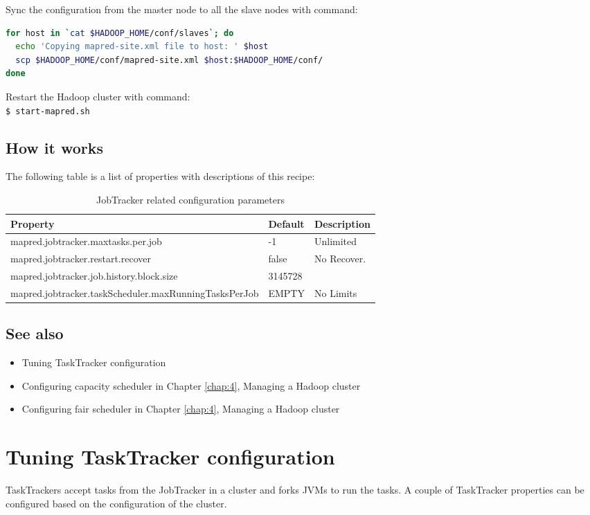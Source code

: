 Sync the configuration from the master node to all the slave nodes with command:
\lstset{style=bashstyle}
\begin{lstlisting}[language=bash]
for host in `cat $HADOOP_HOME/conf/slaves`; do
  echo 'Copying mapred-site.xml file to host: ' $host
  scp $HADOOP_HOME/conf/mapred-site.xml $host:$HADOOP_HOME/conf/
done
\end{lstlisting}


Restart the Hadoop cluster with command: \\
\verb|$ start-mapred.sh|

\subsection*{How it works}
The following table is a list of properties with descriptions of this recipe:
\begin{table}[ht]
  \centering
  \begin{tabular}{lll}
    \toprule
    \textbf{Property} & \textbf{Default} & \textbf{Description} \\ \midrule
    mapred.jobtracker.maxtasks.per.job & -1 & Unlimited \\
    mapred.jobtracker.restart.recover & false & No Recover. \\
    mapred.jobtracker.job.history.block.size & 3145728 & \\
    mapred.jobtracker.taskScheduler.maxRunningTasksPerJob & EMPTY & No Limits \\ \bottomrule
  \end{tabular}
  \caption{JobTracker related configuration parameters}\label{tbl:jobtracker}
\end{table}

\subsection*{See also}
\begin{itemize}
  \item Tuning TaskTracker configuration
  \item Configuring capacity scheduler in Chapter \ref{chap:4}, Managing a Hadoop cluster
  \item Configuring fair scheduler in Chapter \ref{chap:4}, Managing a Hadoop cluster
\end{itemize}
\section{Tuning TaskTracker configuration}
TaskTrackers accept tasks from the JobTracker in a cluster and forks JVMs to run the tasks. A couple of TaskTracker properties can be configured based on the configuration of the cluster.

